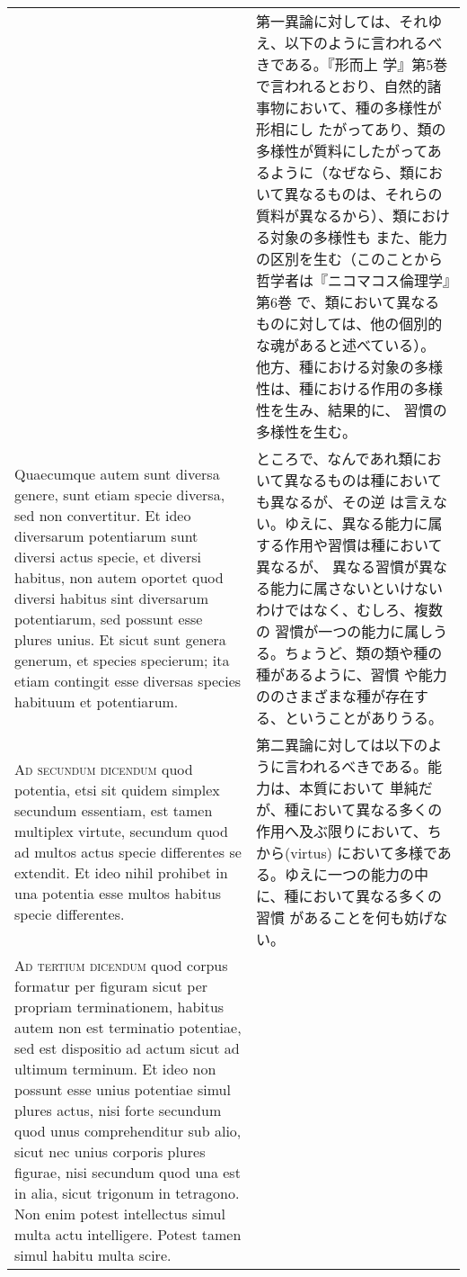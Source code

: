 \documentclass[10pt]{jsarticle}
\begin{document}
\begin{longtable}{p{21em}p{21em}}
&

第一異論に対しては、それゆえ、以下のように言われるべきである。『形而上
学』第5巻で言われるとおり、自然的諸事物において、種の多様性が形相にし
たがってあり、類の多様性が質料にしたがってあるように（なぜなら、類にお
いて異なるものは、それらの質料が異なるから）、類における対象の多様性も
また、能力の区別を生む（このことから哲学者は『ニコマコス倫理学』第6巻
で、類において異なるものに対しては、他の個別的な魂があると述べている）。
他方、種における対象の多様性は、種における作用の多様性を生み、結果的に、
習慣の多様性を生む。

\\

Quaecumque autem sunt diversa genere, sunt etiam specie diversa, sed
non convertitur. Et ideo diversarum potentiarum sunt diversi actus
specie, et diversi habitus, non autem oportet quod diversi habitus
sint diversarum potentiarum, sed possunt esse plures unius. Et sicut
sunt genera generum, et species specierum; ita etiam contingit esse
diversas species habituum et potentiarum.

&

ところで、なんであれ類において異なるものは種においても異なるが、その逆
は言えない。ゆえに、異なる能力に属する作用や習慣は種において異なるが、
異なる習慣が異なる能力に属さないといけないわけではなく、むしろ、複数の
習慣が一つの能力に属しうる。ちょうど、類の類や種の種があるように、習慣
や能力ののさまざまな種が存在する、ということがありうる。

\\

{\scshape Ad secundum dicendum} quod potentia, etsi sit quidem simplex secundum
essentiam, est tamen multiplex virtute, secundum quod ad multos actus
specie differentes se extendit. Et ideo nihil prohibet in una potentia
esse multos habitus specie differentes.

&

第二異論に対しては以下のように言われるべきである。能力は、本質において
単純だが、種において異なる多くの作用へ及ぶ限りにおいて、ちから(virtus)
において多様である。ゆえに一つの能力の中に、種において異なる多くの習慣
があることを何も妨げない。

\\

{\scshape Ad tertium dicendum} quod corpus formatur per figuram sicut
per propriam terminationem, habitus autem non est terminatio
potentiae, sed est dispositio ad actum sicut ad ultimum terminum. Et
ideo non possunt esse unius potentiae simul plures actus, nisi forte
secundum quod unus comprehenditur sub alio, sicut nec unius corporis
plures figurae, nisi secundum quod una est in alia, sicut trigonum in
tetragono. Non enim potest intellectus simul multa actu
intelligere. Potest tamen simul habitu multa scire.


\end{longtable}
\end{document}
